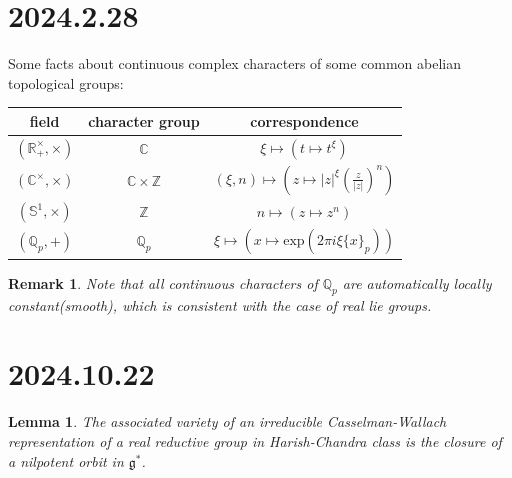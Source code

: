\documentclass[12pt]{amsart}
\numberwithin{equation}{section}
\newtheorem{lem}[thm]{Lemma}
\newtheorem{rk}[thm]{Remark}
\newcommand{\BC}{{\mathbb {C}}}
\newcommand{\BQ}{{\mathbb {Q}}}
\newcommand{\BR}{{\mathbb {R}}}
\newcommand{\BS}{{\mathbb {S}}}
\newcommand{\BZ}{{\mathbb {Z}}}
\newcommand{\fg}{\mathfrak{g}}
\begin{document}
\newpage

\section{2024.2.28}\label{5}
Some facts about continuous complex characters of some common abelian topological groups:

\begin{tabular}{|c|c|c|}
  \hline
  field            & character group & correspondence                                \\
  \hline
  $(\BR^\times_+,\times)$        & $\BC$           & $\xi \mapsto (t \mapsto t^\xi)$ \\
  \hline
  $(\BC^\times,\times) $ &    $\BC \times \BZ$             & $(\xi,n) \mapsto (z \mapsto |z|^\xi (\frac{z}{|z|})^n)$                                              \\
  \hline
  $(\BS^1,\times)$          &  $\BZ$               & $n \mapsto (z \mapsto z^n)$                                              \\
  \hline
  $(\BQ_p,+)$          & $\BQ_p$                 &  $\xi \mapsto (x \mapsto \mathrm{exp}(2\pi i \xi \{ x \}_p))$                                             \\
  \hline
\end{tabular}

\begin{rk}
  Note that all continuous characters of $\BQ_p$ are automatically locally constant(smooth), which is consistent with the case of real lie groups. 
\end{rk}

\newpage

\section{2024.10.22}

\begin{lem}
  The associated variety of an irreducible Casselman-Wallach representation of a real reductive group in Harish-Chandra class is the closure of a nilpotent orbit in $\fg^*$.
\end{lem}
\end{document}
